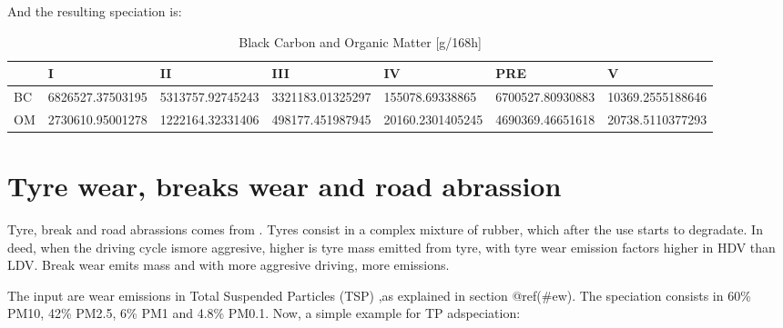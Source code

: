 \documentclass[12pt,graybox,envcountchap,sectrefs]{krantz}
\theoremstyle{definition}
\theoremstyle{definition}
\theoremstyle{definition}
\theoremstyle{remark}
\begin{document}
And the resulting speciation is:

\begin{table}

\caption{\label{tab:unnamed-chunk-84}Black Carbon and Organic Matter [g/168h]}
\centering
\begin{tabular}[t]{l|l|l|l|l|l|l}
\hline
  & I & II & III & IV & PRE & V\\
\hline
BC & 6826527.37503195 & 5313757.92745243 & 3321183.01325297 & 155078.69338865 & 6700527.80930883 & 10369.2555188646\\
\hline
OM & 2730610.95001278 & 1222164.32331406 & 498177.451987945 & 20160.2301405245 & 4690369.46651618 & 20738.5110377293\\
\hline
\end{tabular}
\end{table}

\section{Tyre wear, breaks wear and road
abrassion}\label{tyre-wear-breaks-wear-and-road-abrassion}

Tyre, break and road abrassions comes from
\citet{NtziachristosBoulter2009}. Tyres consist in a complex mixture of
rubber, which after the use starts to degradate. In deed, when the
driving cycle ismore aggresive, higher is tyre mass emitted from tyre,
with tyre wear emission factors higher in HDV than LDV. Break wear emits
mass and with more aggresive driving, more emissions.

The input are wear emissions in Total Suspended Particles (TSP) ,as
explained in section @ref(\#ew). The speciation consists in 60\% PM10,
42\% PM2.5, 6\% PM1 and 4.8\% PM0.1. Now, a simple example for TP
adspeciation:
\end{document}
